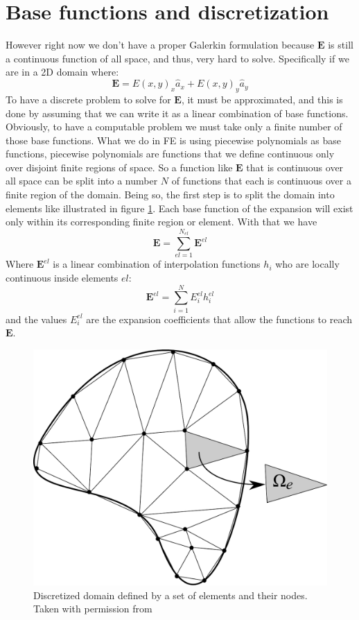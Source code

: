 \section{Base functions and discretization}
However right now we don't have a proper Galerkin formulation because $\mathbf{E}$ is still a continuous function of all space, and thus, very hard to solve. Specifically if we are in a 2D domain where:
\[\mathbf{E}=E(x,y)_x\hat{a}_x + E(x,y)_y \hat{a}_y \]
To have a discrete problem to solve for $\mathbf{E}$, it must be approximated, and this is done by assuming that we can write it as a linear combination of base functions. Obviously,  to have a computable problem we must take only a finite number of those base functions. What we do in FE is using piecewise polynomials as base functions, piecewise polynomials are functions that we define continuous only over disjoint finite regions of space. So a function like $\mathbf{E}$ that is continuous over all space can be split into a number $N$ of functions that each is continuous over a finite region of the domain. 
Being so, the first step is to split the domain into elements like illustrated in figure \ref{fig:disc_domain}. Each base function of the expansion will exist only within its corresponding finite region or element. With that we have
\begin{equation}
\mathbf{E} = \sum_{el=1}^{N_{el}}\mathbf{E}^{el}
\end{equation}
Where $\mathbf{E}^{el}$ is a linear combination of interpolation functions $h_i$ who are locally continuous inside elements $el$:
\begin{equation}
\mathbf{E}^{el} = \sum_{i =1}^N E_i^{el}h_i^{el}
\end{equation}
and the values $E_i^{el}$ are the expansion coefficients that allow the functions to reach $\mathbf{E}$.
\begin{figure}
\centering
\includegraphics[scale=0.3]{./img/dominio_discreto.pdf}
\caption{Discretized domain defined by a set of elements and their nodes. Taken with permission from \cite{Guarin2012}}
\label{fig:disc_domain}
\end{figure}
